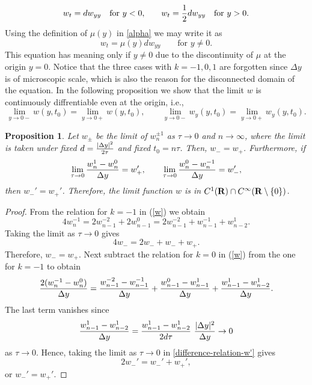 \documentclass[11pt]{amsart}
\def\R{{\bf R}}
\def\d{d}
\def\R{{\bf R}}
\newtheorem{proposition}{Proposition}[section]
\begin{document}
$$
w_t=\d w_{yy}\quad\text{for $y<0,$}\qquad
w_t={1\over2}\d w_{yy}\quad\text{for $y>0$.}
$$
Using the definition of $\mu(y)$ in \eqref{alpha} we may write it as
\begin{equation}\label{EqnForPinY2}
w_t=\mu(y)\d w_{yy} \qquad \text{for $y\ne0$.}
\end{equation}
This equation has meaning only if $y\ne0$ due to the discontinuity of $\mu$ at the origin $y=0$. Notice that the three cases with $k=-1,0,1$ are forgotten since $\Delta y$ is of microscopic scale, which is also the reason for the disconnected domain of the equation. In the following proposition we show that the limit $w$ is continuously diffrentiable even at the origin, i.e.,
\begin{equation*}\label{continuity}
\lim_{y\to0-}w(y,t_0)=\lim_{y\to0+}w(y,t_0),\qquad
\lim_{y\to0-}w_y(y,t_0)=\lim_{y\to0+}w_y(y,t_0).
\end{equation*}


\begin{proposition}\label{proposition} Let $w_\pm$ be the limit of $w_n^{\pm1}$ as $\tau \to0$ and $n\to\infty$, where the limit is taken under fixed $\d={|\Delta y|^2\over 2\tau}$ and fixed $t_0=n\tau$. Then, $w_-=w_+$. Furthermore, if
$$
\lim_{\tau \to0}{w_n^{1}-w_n^0\over\Delta y}=w_+',\qquad \lim_{\tau \to0}{w_n^{0}-w_n^{-1}\over\Delta y}=w_-',
$$
then $w_-'=w_+'$. Therefore, the limit function $w$ is in $C^1(\R)\cap C^\infty(\R\setminus\{0\})$.
\end{proposition}
\begin{proof} From the relation for $k=-1$ in (\ref{w}) we obtain
$$
4w_n^{-1}=2w_{n-1}^{-2}+2w_{n-1}^{0} =2w_{n-1}^{-2}+w_{n-1}^{-1}+w_{n-2}^{1}.
$$
Taking the limit  as $\tau \to0$ gives
$$
4w_-=2w_-+w_-+w_+.
$$
Therefore, $w_-=w_+$. Next subtract the relation for $k=0$ in (\ref{w}) from the one for $k=-1$ to obtain
\begin{equation}\label{difference-relation-w'}
{2(w^{-1}_n-w_n^0)\over\Delta y} ={w^{-2}_{n-1}-w_{n-1}^{-1}\over\Delta y} +{w^{0}_{n-1}-w_{n-1}^{1}\over\Delta y} +{w^{1}_{n-1}-w_{n-2}^{1}\over\Delta y}.
\end{equation}
The last term vanishes since
\begin{equation}\label{w'}
{w^{1}_{n-1}-w_{n-2}^{1}\over\Delta y}={w^{1}_{n-1}-w_{n-2}^{1}\over2\d\tau}\ {|\Delta y|^2\over\Delta y}\to 0
\end{equation}
as $\tau \to0$. Hence, taking the limit as $\tau\to0$ in \eqref{difference-relation-w'} gives
$$
2w_-'=w_-'+w_+',
$$
or $w_-'=w_+'$.
\end{proof}
\end{document}
